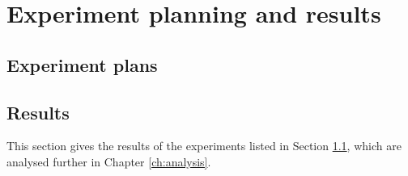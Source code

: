 
\chapter{Experiment planning and results}


\section{Experiment plans}
\label{sec:experiment_plan}

\section{Results}

This section gives the results of the experiments listed in Section \ref{sec:experiment_plan}, which are analysed further in Chapter \ref{ch:analysis}.

\cleardoublepage
